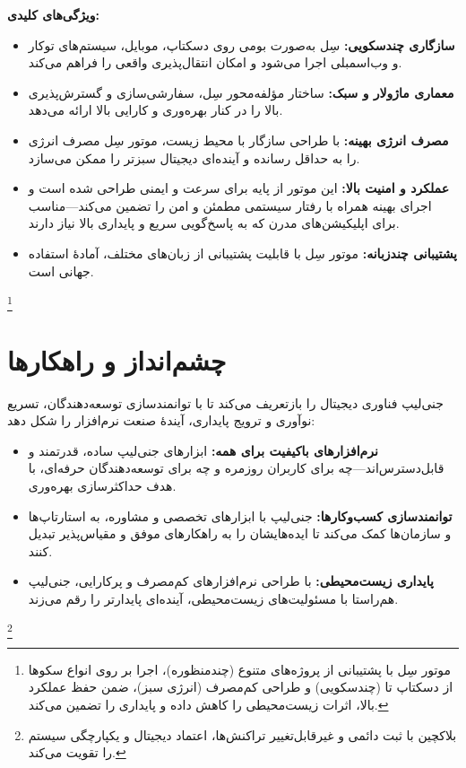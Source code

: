 \documentclass[a4paper,12pt,openany]{book}
\begin{document}
\textbf{ویژگی‌های کلیدی:}
\begin{itemize}
    \item \textbf{سازگاری چندسکویی:} سِل به‌صورت بومی روی دسکتاپ، موبایل، سیستم‌های توکار و وب‌اسمبلی اجرا می‌شود و امکان انتقال‌پذیری واقعی را فراهم می‌کند.
    \item \textbf{معماری ماژولار و سبک:} ساختار مؤلفه‌محور سِل، سفارشی‌سازی و گسترش‌پذیری بالا را در کنار بهره‌وری و کارایی بالا ارائه می‌دهد.
    \item \textbf{مصرف انرژی بهینه:} با طراحی سازگار با محیط زیست، موتور سِل مصرف انرژی را به حداقل رسانده و آینده‌ای دیجیتال سبزتر را ممکن می‌سازد.
    \item \textbf{عملکرد و امنیت بالا:} این موتور از پایه برای سرعت و ایمنی طراحی شده است و اجرای بهینه همراه با رفتار سیستمی مطمئن و امن را تضمین می‌کند—مناسب برای اپلیکیشن‌های مدرن که به پاسخ‌گویی سریع و پایداری بالا نیاز دارند.
    \item \textbf{پشتیبانی چندزبانه:} موتور سِل با قابلیت پشتیبانی از زبان‌های مختلف، آماده‌ٔ استفاده جهانی است.
\end{itemize}

\footnote{موتور سِل با پشتیبانی از پروژه‌های متنوع (چندمنظوره)، اجرا بر روی انواع سکوها از دسکتاپ تا  (چندسکویی) و طراحی کم‌مصرف (انرژی سبز)، ضمن حفظ عملکرد بالا، اثرات زیست‌محیطی را کاهش داده و پایداری را تضمین می‌کند.}

\chapter{چشم‌انداز و راهکارها}
جنی‌لیپ فناوری دیجیتال را بازتعریف می‌کند تا با توانمندسازی توسعه‌دهندگان، تسریع نوآوری و ترویج پایداری، آینده‌ٔ صنعت نرم‌افزار را شکل دهد:
\begin{itemize}
    \item \textbf{نرم‌افزارهای باکیفیت برای همه:} ابزارهای جنی‌لیپ ساده، قدرتمند و قابل‌دسترس‌اند—چه برای کاربران روزمره و چه برای توسعه‌دهندگان حرفه‌ای، با هدف حداکثرسازی بهره‌وری.
    \item \textbf{توانمندسازی کسب‌وکارها:} جنی‌لیپ با ابزارهای تخصصی و مشاوره، به استارتاپ‌ها و سازمان‌ها کمک می‌کند تا ایده‌هایشان را به راهکارهای موفق و مقیاس‌پذیر تبدیل کنند.
    \item \textbf{پایداری زیست‌محیطی:} با طراحی نرم‌افزارهای کم‌مصرف و پرکارایی، جنی‌لیپ هم‌راستا با مسئولیت‌های زیست‌محیطی، آینده‌ای پایدارتر را رقم می‌زند.
\end{itemize}

\footnote{بلاکچین با ثبت دائمی و غیرقابل‌تغییر تراکنش‌ها، اعتماد دیجیتال و یکپارچگی سیستم را تقویت می‌کند.}
\end{document}
